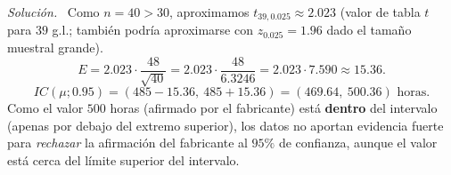 \documentclass[11pt,a4paper]{article}
\newenvironment{solucion}{\par\noindent\textit{Solución.}~}{\par\vspace{1em}}
\begin{document}
\begin{solucion}
Como $n=40>30$, aproximamos $t_{39,0.025}\approx 2.023$ (valor de tabla $t$ para $39$ g.l.; también podría aproximarse con $z_{0.025}=1.96$ dado el tamaño muestral grande).
\[
E = 2.023\cdot\frac{48}{\sqrt{40}} = 2.023\cdot\frac{48}{6.3246} = 2.023\cdot 7.590 \approx 15.36.
\]
\[
IC(\mu;0.95) = (485-15.36,\ 485+15.36) = (469.64,\ 500.36) \text{ horas}.
\]
Como el valor $500$ horas (afirmado por el fabricante) está \textbf{dentro} del intervalo (apenas por debajo del extremo superior), los datos no aportan evidencia fuerte para \emph{rechazar} la afirmación del fabricante al $95\%$ de confianza, aunque el valor está cerca del límite superior del intervalo.
\end{solucion}
\end{document}
